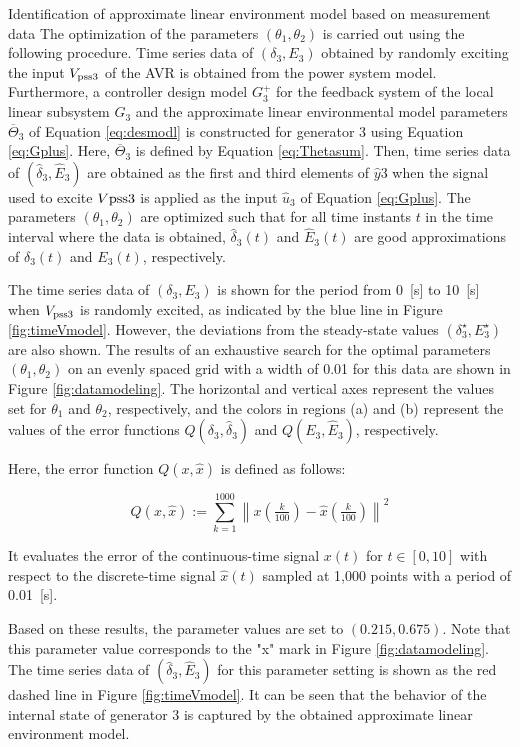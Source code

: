 \documentclass[graybox, envcountchap]{svmult}
\begin{document}
\begin{example}{Identification of approximate linear environment model based on
measurement data}
The optimization of the parameters $(\theta_1, \theta_2)$ is carried out using
the following procedure. Time series data of $(\delta_3, E_3)$ obtained by
randomly exciting the input $V_{{\rm pss}3}$ of the AVR is obtained from the
power system model. Furthermore, a controller design model $G_{3}^+$ for the
feedback system of the local linear subsystem $G_3$ and the approximate linear
environmental model parameters $\overline{\mathit{\Theta}}_3$ of Equation
\ref{eq:desmodl} is constructed for generator 3 using Equation \ref{eq:Gplus}.
Here, $\overline{\mathit{\Theta}}_3$ is defined by Equation \ref{eq:Thetasum}.
Then, time series data of $(\hat{\delta}_3, \hat{E}_3)$ are obtained as the
first and third elements of $\hat{y}3$ when the signal used to excite $V{{\rm
pss}3}$ is applied as the input $\hat{u}_3$ of Equation \ref{eq:Gplus}. The
parameters $(\theta_1, \theta_2)$ are optimized such that for all time instants
$t$ in the time interval where the data is obtained, $\hat{\delta}_3(t)$ and
$\hat{E}_3(t)$ are good approximations of $\delta_3(t)$ and $E_3(t)$,
respectively.

The time series data of $(\delta_3,E_3)$ is shown for the period from 0~[s] to
10~[s] when $V_{{\rm pss}3}$ is randomly excited, as indicated by the blue line
in Figure \ref{fig:timeVmodel}. However, the deviations from the steady-state
values $(\delta_3^{\star},E_3^{\star})$ are also shown. The results of an
exhaustive search for the optimal parameters $(\theta_1,\theta_2)$ on an evenly
spaced grid with a width of 0.01 for this data are shown in Figure
\ref{fig:datamodeling}. The horizontal and vertical axes represent the values
set for $\theta_1$ and $\theta_2$, respectively, and the colors in regions (a)
and (b) represent the values of the error functions $Q(\delta_3,\hat{\delta}_3)$
and $Q(E_3,\hat{E}_3)$, respectively.

Here, the error function $Q(x,\hat{x})$ is defined as follows:

\[
  Q(x,\hat{x}):=
  \sum_{k=1}^{1000}
  \left\|
  x\left(
  \tfrac{k}{100}
  \right)
  -
  \hat{x}\left(
  \tfrac{k}{100}
  \right)
  \right\|^2
\]

It evaluates the error of the continuous-time signal $x(t)$ for $t \in [0,10]$
with respect to the discrete-time signal $\hat{x}(t)$ sampled at 1,000 points
with a period of 0.01~[s].

Based on these results, the parameter values are set to $(0.215,0.675)$. Note
that this parameter value corresponds to the "x" mark in Figure
\ref{fig:datamodeling}. The time series data of $(\hat{\delta}_3,\hat{E}_3)$ for
this parameter setting is shown as the red dashed line in Figure
\ref{fig:timeVmodel}. It can be seen that the behavior of the internal state of
generator 3 is captured by the obtained approximate linear environment model.

\end{example}
\end{document}
